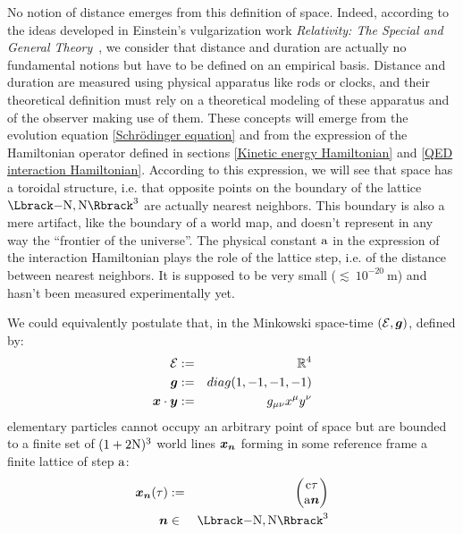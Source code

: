 \documentclass[10pt,a4paper,twoside,openany]{book}
\begin{document}
 No notion of distance emerges from this definition of space. Indeed, according to the ideas developed in Einstein's vulgarization work \textit{Relativity: The Special and General Theory}~\cite{Einstein1916}, we consider that distance and duration are actually no fundamental notions but have to be defined on an empirical basis. Distance and duration are measured using physical apparatus like rods or clocks, and their theoretical definition must rely on a theoretical modeling of these apparatus and of the observer making use of them.
These concepts will emerge from the evolution equation \ref{Schrödinger equation} and from the expression of the Hamiltonian operator defined in sections \ref{Kinetic energy Hamiltonian} and \ref{QED interaction Hamiltonian}. According to this expression, we will see that space has a toroidal structure, i.e. that opposite points on the boundary of the lattice $\FL$ are actually nearest neighbors. This boundary is also a mere artifact, like the boundary of a world map, and doesn't represent in any way the ``frontier of the universe''. The physical constant $\mathrm a$ in the expression of the interaction Hamiltonian plays the role of the lattice step, i.e. of the distance between nearest neighbors. It is supposed to be very small ($\lesssim~10^{-20}~\mathrm m$) and hasn't been measured experimentally yet.

 We could equivalently postulate that, in the Minkowski space-time $(\mathcal E,\boldsymbol{g})$, defined by:
\begin{eqnarray*}
\mathcal E & := & \mathbb{R}^4 \\
\boldsymbol{g} & := & diag(1,-1,-1,-1) \\
\boldsymbol{x} \cdot \boldsymbol{y} & := & {g}_{\mu\nu} {x}^{\mu} {y}^{\nu}
\end{eqnarray*}
elementary particles cannot occupy an arbitrary point of space but are bounded to a finite set of $(1+2 \mathrm N)^3$ world lines $\boldsymbol{x}_{\boldsymbol{n}}$ forming in some reference frame a finite lattice of step $\mathrm a$:
\begin{eqnarray*}
\wlt \n \tau & \eqdef & \matrix{\c \tau \\ \a \n} \\
\n & \in & \FL
\end{eqnarray*}
\end{document}

